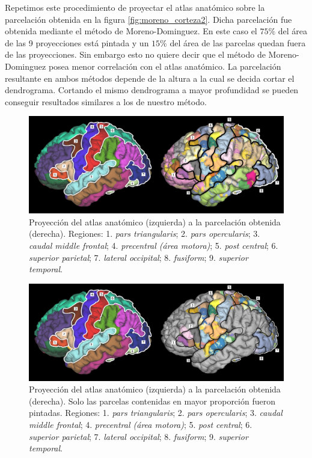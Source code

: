 Repetimos este procedimiento de proyectar el atlas anat\'omico sobre la
parcelaci\'on obtenida en la figura \ref{fig:moreno_corteza2}. Dicha
parcelaci\'on fue obtenida mediante el m\'etodo de Moreno-Dominguez.
En este caso el $75\%$ del \'area de las 9 proyecciones est\'a pintada y 
un $15\%$ del \'area de las parcelas quedan fuera de las proyecciones. 
Sin embargo esto no quiere decir que el m\'etodo de Moreno-Dominguez 
posea menor correlaci\'on con el atlas anat\'omico. La parcelaci\'on 
resultante en ambos m\'etodos depende de la altura a la cual se decida 
cortar el dendrograma. Cortando el mismo dendrograma a mayor profundidad
se pueden conseguir resultados similares a los de nuestro m\'etodo.\\


\begin{figure}[h!]
    \includegraphics[width=\textwidth]{img/anatomica2parcelation.png}
    \caption{Proyecci\'on del atlas anat\'omico (izquierda) a la 
             parcelaci\'on obtenida (derecha). Regiones: 
             1. \textit{pars triangularis}; 2. \textit{pars opercularis};
             3. \textit{caudal middle frontal}; 
             4. \textit{precentral (\'area motora)}; 
             5. \textit{post central}; 6. \textit{superior parietal}; 
             7. \textit{lateral occipital}; 8. \textit{fusiform};
             9. \textit{superior temporal}.  }
    \label{fig:an2pa}
\end{figure}

\begin{figure}[h!]
    \includegraphics[width=\textwidth]{img/anatomica2parcelation2.png}
    \caption{Proyecci\'on del atlas anat\'omico (izquierda) a la 
             parcelaci\'on obtenida (derecha). Solo las parcelas contenidas
             en mayor proporci\'on fueron pintadas. Regiones: 
             1. \textit{pars triangularis}; 2. \textit{pars opercularis};
             3. \textit{caudal middle frontal}; 
             4. \textit{precentral (\'area motora)}; 
             5. \textit{post central}; 6. \textit{superior parietal}; 
             7. \textit{lateral occipital}; 8. \textit{fusiform};
             9. \textit{superior temporal}.  }
    \label{fig:an2pa2}
\end{figure}

